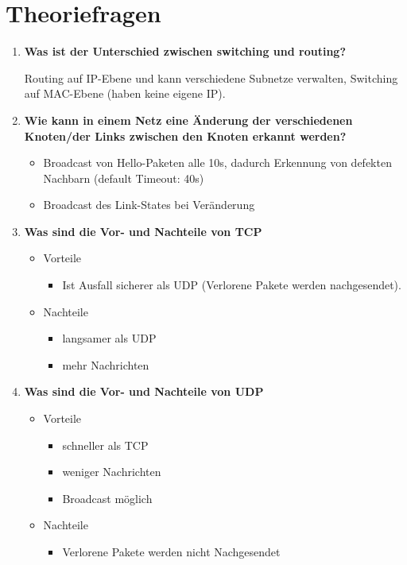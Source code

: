 \documentclass{article}
\begin{document}
\section{Theoriefragen}
\begin{enumerate}
	\item \textbf{Was ist der Unterschied zwischen switching und routing?}
	\begin{flushleft}
		Routing auf IP-Ebene und kann verschiedene Subnetze verwalten, Switching auf MAC-Ebene (haben keine eigene IP).
	\end{flushleft}
	\item \textbf{Wie kann in einem Netz eine Änderung der verschiedenen Knoten/der Links zwischen den Knoten erkannt werden?}
	\begin{itemize}
		\item Broadcast von Hello-Paketen alle 10s, dadurch Erkennung von defekten Nachbarn (default Timeout: 40s)
		\item Broadcast des Link-States bei Veränderung
	\end{itemize}
	\item \textbf{Was sind die Vor- und Nachteile von TCP}
	\begin{itemize}
		\item Vorteile
			\begin{itemize}
				\item Ist Ausfall sicherer als UDP (Verlorene Pakete werden nachgesendet).
			\end{itemize}
		\item Nachteile
			\begin{itemize}
				\item langsamer als UDP 
				\item mehr Nachrichten
			\end{itemize}
	\end{itemize}
	\item \textbf{Was sind die Vor- und Nachteile von UDP}
	\begin{itemize}
		\item Vorteile
		\begin{itemize}
			\item schneller als TCP
			\item weniger Nachrichten
			\item Broadcast möglich
		\end{itemize}
		\item Nachteile
		\begin{itemize}
			\item Verlorene Pakete werden nicht Nachgesendet

\end{itemize}
\end{itemize}
\end{enumerate}
\end{document}
